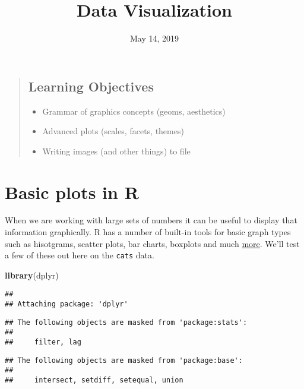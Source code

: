 \documentclass[11pt,]{article}
\title{Data Visualization}
\author{}
\date{May 14, 2019}
\newenvironment{Shaded}{\begin{snugshade}}{\end{snugshade}}
\newcommand{\KeywordTok}[1]{\textcolor[rgb]{0.13,0.29,0.53}{\textbf{#1}}}
\newcommand{\NormalTok}[1]{#1}
\providecommand{\tightlist}{%
  \setlength{\itemsep}{0pt}\setlength{\parskip}{0pt}}
\begin{document}
\maketitle

{
\hypersetup{linkcolor=black}
\setcounter{tocdepth}{2}
\tableofcontents
}
\begin{quote}
\hypertarget{learning-objectives}{%
\subsection{Learning Objectives}\label{learning-objectives}}

\begin{itemize}
\tightlist
\item
  Grammar of graphics concepts (geoms, aesthetics)
\item
  Advanced plots (scales, facets, themes)
\item
  Writing images (and other things) to file
\end{itemize}
\end{quote}

\hypertarget{basic-plots-in-r}{%
\section{Basic plots in R}\label{basic-plots-in-r}}

When we are working with large sets of numbers it can be useful to
display that information graphically. R has a number of built-in tools
for basic graph types such as hisotgrams, scatter plots, bar charts,
boxplots and much \href{http://www.statmethods.net/graphs/}{more}. We'll
test a few of these out here on the \texttt{cats} data.

\begin{Shaded}
\begin{Highlighting}[]
\KeywordTok{library}\NormalTok{(dplyr)}
\end{Highlighting}
\end{Shaded}

\begin{verbatim}
## 
## Attaching package: 'dplyr'
\end{verbatim}

\begin{verbatim}
## The following objects are masked from 'package:stats':
## 
##     filter, lag
\end{verbatim}

\begin{verbatim}
## The following objects are masked from 'package:base':
## 
##     intersect, setdiff, setequal, union
\end{verbatim}
\end{document}
